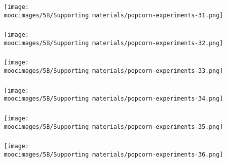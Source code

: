 \documentclass[handout,11pt,aspectratio=169,mathserif]{beamer}
\begin{document}
\begin{frame}\frametitle{}
	\centerline{\texttt{[image: \\moocimages/5B/Supporting materials/popcorn-experiments-31.png]}}
\end{frame}
\begin{frame}\frametitle{}
	\centerline{\texttt{[image: \\moocimages/5B/Supporting materials/popcorn-experiments-32.png]}}
\end{frame}
\begin{frame}\frametitle{}
	\centerline{\texttt{[image: \\moocimages/5B/Supporting materials/popcorn-experiments-33.png]}}
\end{frame}
\begin{frame}\frametitle{}
	\centerline{\texttt{[image: \\moocimages/5B/Supporting materials/popcorn-experiments-34.png]}}
\end{frame}
\begin{frame}\frametitle{}
	\centerline{\texttt{[image: \\moocimages/5B/Supporting materials/popcorn-experiments-35.png]}}
\end{frame}
\begin{frame}\frametitle{}
	\centerline{\texttt{[image: \\moocimages/5B/Supporting materials/popcorn-experiments-36.png]}}
\end{frame}
\end{document}
